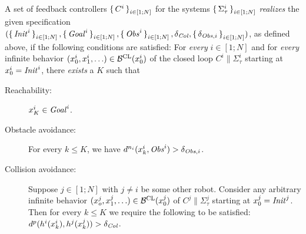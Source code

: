 A set of feedback controllers $\set{C^i}_{i\in [1;N]}$ for the systems $\set{\Sigma_\tau^i}_{i\in [1;N]}$ \emph{realizes} the given specification $(\set{\mathit{Init}^i}_{i\in [1;N]}, \set{\mathit{Goal}^i}_{i\in [1;N]}, \set{\mathit{Obs}^i}_{i\in [1;N]}, \delta_{\mathit{Col}}, \set{\delta_{\mathit{Obs},i}}_{i\in [1;N]})$, as defined above, if the following conditions are satisfied:
For \emph{every} $i\in [1;N]$ and for \emph{every} infinite behavior $(x_0^i,x_1^i,\ldots)\in \mathcal{B}^{\mathrm{CL}}(x_0^i)$ of the closed loop $C^i\parallel \Sigma_\tau^i$ starting at $x_0^i=\mathit{Init}^i$, there \emph{exists} a $K$ such that
\begin{description}
	\item[Reachability:] $x_K^i\in \mathit{Goal}^i$.
	\item[Obstacle avoidance:] For every $k\leq K$, we have $d^{n_i}(x_k^i,\mathit{Obs}^i) > \delta_{\mathit{Obs},i}$.
	\item[Collision avoidance:] 
		Suppose $j\in [1;N]$ with $j\neq i$ be some other robot.
		Consider any arbitrary infinite behavior $(x_o^j, x_1^j,\ldots)\in \mathcal{B}^{\mathrm{CL}}(x_0^j)$ of $C^j\parallel \Sigma_\tau^j$ starting at $x_0^j=\mathit{Init}^j$. 
		Then for every $k\leq K$ we require the following to be satisfied: $d^{p}(h^i(x^i_k),h^j(x^j_k))>\delta_{\mathit{Col}}$.
\end{description}

